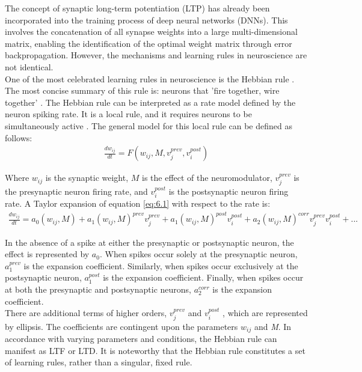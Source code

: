 \noindent The concept of synaptic long-term potentiation (LTP) has already been incorporated into the training process of deep neural networks (DNNs). This involves the concatenation of all synapse weights into a large multi-dimensional matrix, enabling the identification of the optimal weight matrix through error backpropagation. However, the mechanisms and learning rules in neuroscience are not identical. \\

\noindent One of the most celebrated learning rules in neuroscience is the Hebbian rule \cite{hebb2002organization}. The most concise summary of this rule is: neurons that 'fire together, wire together' \cite{shatz1992developing}. The Hebbian rule can be interpreted as a rate model defined by the neuron spiking rate. It is a local rule, and it requires neurons to be simultaneously active \cite{gerstner2014neuronal}. The general model for this local rule can be defined as follows:
\begin{align}
\frac{dw_{ij}}{dt} = F\left( w_{ij},M,v^{prev}_j,v^{post}_i \right) \label{eq:6.1} 
\end{align}

\noindent Where $w_{ij}$ is the synaptic weight, $M$ is the effect of the neuromodulator, $v^{prev}_j$ is the presynaptic neuron firing rate, and $v^{post}_i$ is the postsynaptic neuron firing rate. A Taylor expansion of equation \ref{eq:6.1} with respect to the rate is:
\begin{align}
\frac{dw_{ij}}{dt} = a_0({w_{ij},M}) + a_1({w_{ij},M})^{prev}v^{prev}_j + a_1({w_{ij},M})^{post}v^{post}_i + a_2({w_{ij},M})^{corr}v^{prev}_jv^{post}_i + ... \label{eq:6.2} 
\end{align}

\noindent In the absence of a spike at either the presynaptic or postsynaptic neuron, the effect is represented by $a_0$. When spikes occur solely at the presynaptic neuron, $a^{prev}_1$ is the expansion coefficient. Similarly, when spikes occur exclusively at the postsynaptic neuron, $a^{post}_1$ is the expansion coefficient. Finally, when spikes occur at both the presynaptic and postsynaptic neurons, $a^{corr}_2$  is the expansion coefficient.\\

\noindent There are additional terms of higher orders, $v^{prev}_j$  and $v^{post}_i$ , which are represented by ellipsis. The coefficients are contingent upon the parameters $w_{ij}$ and \textit{M}. In accordance with varying parameters and conditions, the Hebbian rule can manifest as LTF or LTD. It is noteworthy that the Hebbian rule constitutes a set of learning rules, rather than a singular, fixed rule.\\

